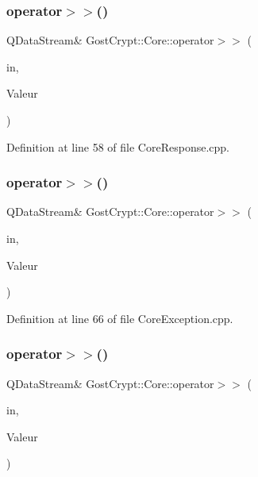 \subsubsection{\texorpdfstring{operator$>$$>$()}{operator>>()}\hspace{0.1cm}{\footnotesize\ttfamily [7/56]}}
{\footnotesize\ttfamily Q\+Data\+Stream\& Gost\+Crypt\+::\+Core\+::operator$>$$>$ (\begin{DoxyParamCaption}\item[{Q\+Data\+Stream \&}]{in,  }\item[{\hyperlink{struct_gost_crypt_1_1_core_1_1_backup_header_response}{Backup\+Header\+Response} \&}]{Valeur }\end{DoxyParamCaption})}



Definition at line 58 of file Core\+Response.\+cpp.

\mbox{\label{namespace_gost_crypt_1_1_core_aa5bdaf36267419d7c241c0a0cf7b9ed0}} 
\subsubsection{\texorpdfstring{operator$>$$>$()}{operator>>()}\hspace{0.1cm}{\footnotesize\ttfamily [8/56]}}
{\footnotesize\ttfamily Q\+Data\+Stream\& Gost\+Crypt\+::\+Core\+::operator$>$$>$ (\begin{DoxyParamCaption}\item[{Q\+Data\+Stream \&}]{in,  }\item[{\hyperlink{class_gost_crypt_1_1_core_1_1_volume_already_mounted}{Gost\+Crypt\+::\+Core\+::\+Volume\+Already\+Mounted} \&}]{Valeur }\end{DoxyParamCaption})}



Definition at line 66 of file Core\+Exception.\+cpp.

\mbox{\label{namespace_gost_crypt_1_1_core_a3088e9a1e627d976f09bc06d868e9795}} 
\subsubsection{\texorpdfstring{operator$>$$>$()}{operator>>()}\hspace{0.1cm}{\footnotesize\ttfamily [9/56]}}
{\footnotesize\ttfamily Q\+Data\+Stream\& Gost\+Crypt\+::\+Core\+::operator$>$$>$ (\begin{DoxyParamCaption}\item[{Q\+Data\+Stream \&}]{in,  }\item[{\hyperlink{struct_gost_crypt_1_1_core_1_1_restore_header_response}{Restore\+Header\+Response} \&}]{Valeur }\end{DoxyParamCaption})}



